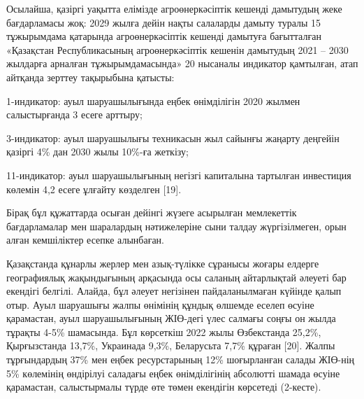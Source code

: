 \begin{multicols}{2}
Осылайша, қазіргі уақытта елімізде агроөнеркәсіптік кешенді дамытудың
жеке бағдарламасы жоқ: 2029 жылға дейін нақты салаларды дамыту туралы 15
тұжырымдама қатарында агроөнеркәсіптік кешенді дамытуға бағытталған
«Қазақстан Республикасының агроөнеркәсіптік кешенін дамытудың 2021 --
2030 жылдарға арналған тұжырымдамасында» 20 нысаналы индикатор
қамтылған, атап айтқанда зерттеу тақырыбына қатысты:

1-индикатор: ауыл шаруашылығында еңбек өнімділігін 2020 жылмен
салыстырғанда 3 есеге арттыру;

3-индикатор: ауыл шаруашылығы техникасын жыл сайынғы жаңарту деңгейін
қазіргі 4\% дан 2030 жылы 10\%-ға жеткізу;

11-индикатор: ауыл шаруашылығының негізгі капиталына тартылған
инвестиция көлемін 4,2 есеге ұлғайту көзделген {[}19{]}.

Бірақ бұл құжаттарда осыған дейінгі жүзеге асырылған мемлекеттік
бағдарламалар мен шаралардың нәтижелеріне сыни талдау жүргізілмеген,
орын алған кемшіліктер есепке алынбаған.

Қазақстанда құнарлы жерлер мен азық-түлікке сұранысы жоғары елдерге
географиялық жақындығының арқасында осы саланың айтарлықтай әлеуеті бар
екендігі белгілі. Алайда, бұл әлеует негізінен пайдаланылмаған күйінде
қалып отыр. Ауыл шаруашығы жалпы өнімінің құндық өлшемде еселеп өсуіне
қарамастан, ауыл шаруашылығының ЖІӨ-дегі үлес салмағы соңғы он жылда
тұрақты 4-5\% шамасында. Бұл көрсеткіш 2022 жылы Өзбекстанда 25,2\%,
Қырғызстанда 13,7\%, Украинада 9,3\%, Беларусьта 7,7\% құраған {[}20{]}.
Жалпы тұрғындардың 37\% мен еңбек ресурстарының 12\% шоғырланған салады
ЖІӨ-нің 5\% көлемінің өндірілуі саладағы еңбек өнімділігінің абсолютті
шамада өсуіне қарамастан, салыстырмалы түрде өте төмен екендігін
көрсетеді (2-кесте).
\end{multicols}

